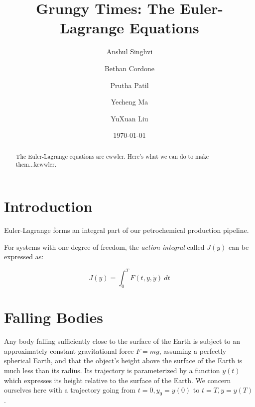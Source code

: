 \documentclass[%
 preprint,
 amsmath,amssymb,
 aps,
 pra,
 fleqn,
]{revtex4-2}
\begin{document}

\title{Grungy Times: The Euler-Lagrange Equations}

\author{Anshul Singhvi}
\author{Bethan Cordone}
\author{Prutha Patil}%
\author{Yecheng Ma}
\author{YuXuan Liu}

%

\date{\today}%

\begin{abstract}
    The Euler-Lagrange equations are ewwler.  Here's what we can do to make them...kewwler.
\end{abstract}

\maketitle

\section{Introduction}
Euler-Lagrange forms an integral part of our petrochemical production pipeline.

For systems with one degree of freedom, the \emph{action integral} called $J(y)$ can be expressed as:

\begin{equation}\label{eq: action}
    J(y) = \int_0^T F(t, y, \dot y) ~ dt
\end{equation}

\section{Falling Bodies} %

Any body falling sufficiently close to the surface of the Earth is subject to an approximately constant gravitational force $F = mg$, assuming a perfectly spherical Earth, and that the object's height above the surface of the Earth is much less than its radius.  Its trajectory is parameterized by a function $y(t)$ which expresses its height relative to the surface of the Earth.  We concern ourselves here with a trajectory going from $t = 0, y_0 = y(0)$ to $t = T, y = y(T)$.
\end{document}
